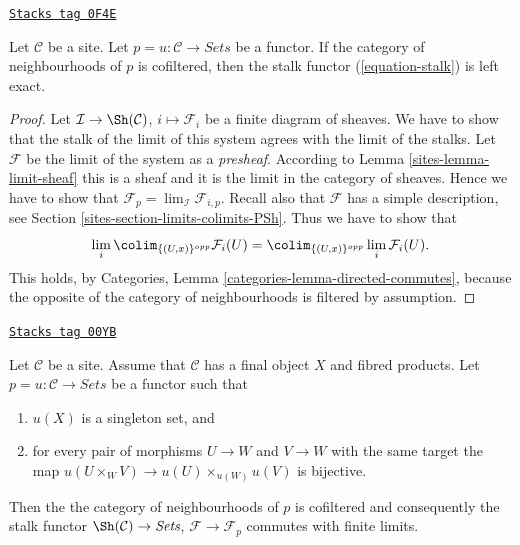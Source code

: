 \begin{lemma}
\label{sites-lemma-neighbourhoods-cofiltered}
\href{https://stacks.math.columbia.edu/tag/0F4E}{\texttt{Stacks tag 0F4E}}

Let $\mathcal{C}$ be a site. Let $p = u : \mathcal{C} \to \textit{Sets}$
be a functor. If the category of neighbourhoods of $p$ is
cofiltered, then the stalk functor (\ref{equation-stalk})
is left exact.
\end{lemma}

\begin{proof}

Let $\mathcal{I} \to \Sh(\mathcal{C})$,
$i \mapsto \mathcal{F}_i$ be a finite diagram of sheaves.
We have to show that the stalk of the limit of this
system agrees with the limit of the stalks.
Let $\mathcal{F}$ be the limit of the system as a {\it presheaf}.
According to Lemma \ref{sites-lemma-limit-sheaf} this is a sheaf and
it is the limit in the category of sheaves.
Hence we have to show that
$\mathcal{F}_p = \lim_\mathcal{I} \mathcal{F}_{i, p}$.
Recall also that $\mathcal{F}$ has a simple description, see
Section \ref{sites-section-limits-colimits-PSh}. Thus we have to show that
$$
\lim_i \colim_{\{(U, x)\}^{opp}} \mathcal{F}_i(U)
=
\colim_{\{(U, x)\}^{opp}} \lim_i \mathcal{F}_i(U).
$$
This holds, by Categories, Lemma \ref{categories-lemma-directed-commutes},
because the opposite of the category of neighbourhoods is filtered
by assumption.
\end{proof}

\begin{lemma}
\label{sites-lemma-neighbourhoods-directed}
\href{https://stacks.math.columbia.edu/tag/00YB}{\texttt{Stacks tag 00YB}}

Let $\mathcal{C}$ be a site. Assume that $\mathcal{C}$ has
a final object $X$ and fibred products.
Let $p = u : \mathcal{C} \to \textit{Sets}$ be a functor such that
\begin{enumerate}
\item $u(X)$ is a singleton set, and
\item for every pair of morphisms $U \to W$ and $V \to W$ with
the same target the map
$u(U \times_W V) \to u(U) \times_{u(W)} u(V)$ is bijective.
\end{enumerate}
Then the the category of neighbourhoods of $p$ is cofiltered
and consequently the stalk functor $\Sh(\mathcal{C}) \to \textit{Sets}$,
$\mathcal{F} \to \mathcal{F}_p$ commutes with finite limits.
\end{lemma}


